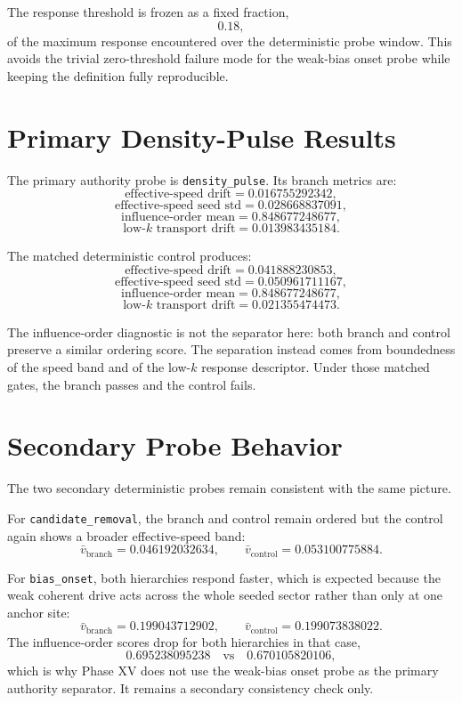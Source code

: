 \documentclass[11pt]{article}
\begin{document}
The response threshold is frozen as a fixed fraction,
\[
0.18,
\]
of the maximum response encountered over the deterministic probe window. This avoids the trivial zero-threshold failure mode for the weak-bias onset probe while keeping the definition fully reproducible.

\section{Primary Density-Pulse Results}

The primary authority probe is \texttt{density\_pulse}. Its branch metrics are:
\[
\text{effective-speed drift} = 0.016755292342,
\]
\[
\text{effective-speed seed std} = 0.028668837091,
\]
\[
\text{influence-order mean} = 0.848677248677,
\]
\[
\text{low-}k\text{ transport drift} = 0.013983435184.
\]

The matched deterministic control produces:
\[
\text{effective-speed drift} = 0.041888230853,
\]
\[
\text{effective-speed seed std} = 0.050961711167,
\]
\[
\text{influence-order mean} = 0.848677248677,
\]
\[
\text{low-}k\text{ transport drift} = 0.021355474473.
\]

The influence-order diagnostic is not the separator here: both branch and control preserve a similar ordering score. The separation instead comes from boundedness of the speed band and of the low-$k$ response descriptor. Under those matched gates, the branch passes and the control fails.

\section{Secondary Probe Behavior}

The two secondary deterministic probes remain consistent with the same picture.

For \texttt{candidate\_removal}, the branch and control remain ordered but the control again shows a broader effective-speed band:
\[
\bar v_{\mathrm{branch}} = 0.046192032634,
\qquad
\bar v_{\mathrm{control}} = 0.053100775884.
\]

For \texttt{bias\_onset}, both hierarchies respond faster, which is expected because the weak coherent drive acts across the whole seeded sector rather than only at one anchor site:
\[
\bar v_{\mathrm{branch}} = 0.199043712902,
\qquad
\bar v_{\mathrm{control}} = 0.199073838022.
\]
The influence-order scores drop for both hierarchies in that case,
\[
0.695238095238
\quad\text{vs}\quad
0.670105820106,
\]
which is why Phase XV does not use the weak-bias onset probe as the primary authority separator. It remains a secondary consistency check only.
\end{document}
